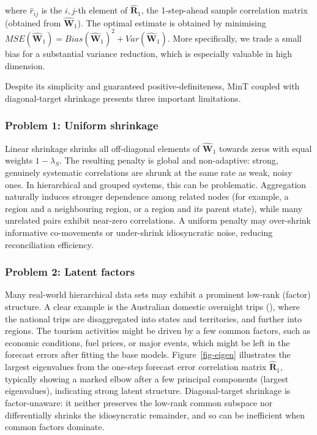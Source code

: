 \documentclass[
  11pt,
  letterpaper,
  DIV=11,
  numbers=noendperiod,
  titlepage]{scrartcl}
\begin{document}
where \(\hat{r}_{ij}\) is the \(i,j\)-th element of
\(\hat{\boldsymbol{R}}_1\), the 1-step-ahead sample correlation matrix
(obtained from \(\hat{\boldsymbol{W}}_1\)). The optimal estimate is
obtained by minimising
\(MSE(\hat{\boldsymbol{W}}_1) = Bias(\hat{\boldsymbol{W}}_1)^2 + Var(\hat{\boldsymbol{W}}_1)\).
More specifically, we trade a small bias for a substantial variance
reduction, which is especially valuable in high dimension.

Despite its simplicity and guaranteed positive-definiteness, MinT
coupled with diagonal-target shrinkage presents three important
limitations.

\subsubsection*{Problem 1: Uniform shrinkage}\label{prob1}

Linear shrinkage shrinks all off-diagonal elements of
\(\hat{\boldsymbol{W}}_1\) towards zeros with equal weights
\(1 - \lambda_S\). The resulting penalty is global and non-adaptive:
strong, genuinely systematic correlations are shrunk at the same rate as
weak, noisy ones. In hierarchical and grouped systems, this can be
problematic. Aggregation naturally induces stronger dependence among
related nodes (for example, a region and a neighbouring region, or a
region and its parent state), while many unrelated pairs exhibit
near-zero correlations. A uniform penalty may over-shrink informative
co-movements or under-shrink idiosyncratic noise, reducing
reconciliation efficiency.

\subsubsection*{Problem 2: Latent factors}\label{prob2}

Many real-world hierarchical data sets may exhibit a prominent low-rank
(factor) structure. A clear example is the Australian domestic overnight
trips (), where the national trips are disaggregated into states and
territories, and further into regions. The tourism activities might be
driven by a few common factors, such as economic conditions, fuel
prices, or major events, which might be left in the forecast errors
after fitting the base models. Figure~\ref{fig-eigen} illustrates the
largest eigenvalues from the one-step forecast error correlation matrix
\(\hat{\boldsymbol{R}}_1\), typically showing a marked elbow after a few
principal components (largest eigenvalues), indicating strong latent
structure. Diagonal-target shrinkage is factor-unaware: it neither
preserves the low-rank common subspace nor differentially shrinks the
idiosyncratic remainder, and so can be inefficient when common factors
dominate.
\end{document}
